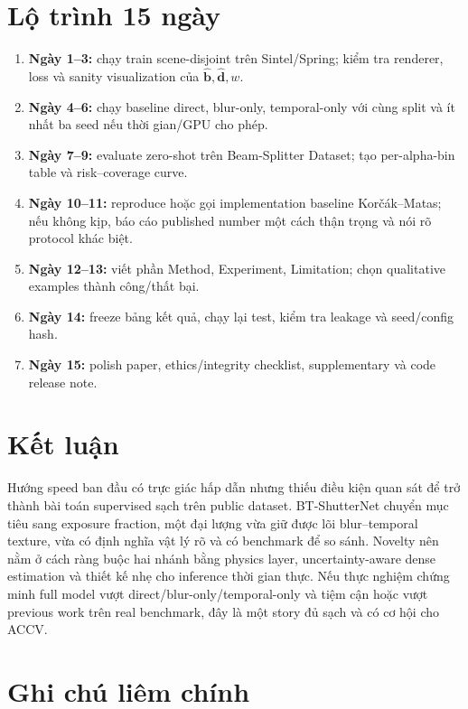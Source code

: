 \documentclass[11pt,a4paper]{article}
\newcommand{\vect}[1]{\mathbf{#1}}
\begin{document}
\section{Lộ trình 15 ngày}

\begin{enumerate}[leftmargin=1.5em]
    \item \textbf{Ngày 1--3:} chạy train scene-disjoint trên Sintel/Spring; kiểm tra renderer, loss và sanity visualization của $\hat{\vect b},\hat{\vect d},w$.
    \item \textbf{Ngày 4--6:} chạy baseline direct, blur-only, temporal-only với cùng split và ít nhất ba seed nếu thời gian/GPU cho phép.
    \item \textbf{Ngày 7--9:} evaluate zero-shot trên Beam-Splitter Dataset; tạo per-alpha-bin table và risk--coverage curve.
    \item \textbf{Ngày 10--11:} reproduce hoặc gọi implementation baseline Korčák--Matas; nếu không kịp, báo cáo published number một cách thận trọng và nói rõ protocol khác biệt.
    \item \textbf{Ngày 12--13:} viết phần Method, Experiment, Limitation; chọn qualitative examples thành công/thất bại.
    \item \textbf{Ngày 14:} freeze bảng kết quả, chạy lại test, kiểm tra leakage và seed/config hash.
    \item \textbf{Ngày 15:} polish paper, ethics/integrity checklist, supplementary và code release note.
\end{enumerate}

\section{Kết luận}

Hướng speed ban đầu có trực giác hấp dẫn nhưng thiếu điều kiện quan sát để trở thành bài toán supervised sạch trên public dataset. BT-ShutterNet chuyển mục tiêu sang exposure fraction, một đại lượng vừa giữ được lõi blur--temporal texture, vừa có định nghĩa vật lý rõ và có benchmark để so sánh. Novelty nên nằm ở cách ràng buộc hai nhánh bằng physics layer, uncertainty-aware dense estimation và thiết kế nhẹ cho inference thời gian thực. Nếu thực nghiệm chứng minh full model vượt direct/blur-only/temporal-only và tiệm cận hoặc vượt previous work trên real benchmark, đây là một story đủ sạch và có cơ hội cho ACCV.

\section*{Ghi chú liêm chính}
\end{document}
